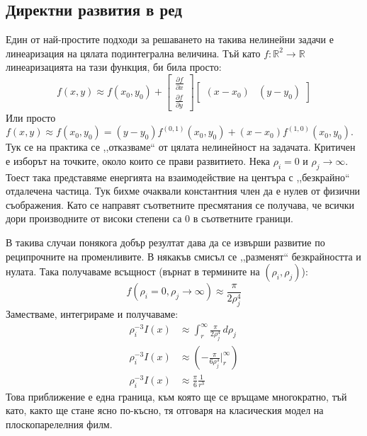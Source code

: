 \subsection{Директни развития в ред}
Един от най-простите подходи за решаването на такива нелинейни задачи е линеаризация на цялата подинтегрална величина. Тъй като $f: \mathbb{R}^2 \rightarrow \mathbb{R}$ линеаризацията на тази функция, би била просто:
\begin{equation*}
	f(x,y) \approx f(x_0,y_0) + \begin{bmatrix}
	\frac{\partial f}{\partial x} \\
	\frac{\partial f}{\partial y} 
	\end{bmatrix} 
	\begin{bmatrix}
		(x-x_0) & (y-y_0) 
	\end{bmatrix}
\end{equation*}
Или просто $f(x,y) \approx f(x_0, y_0) = (y-y_0) f^{(0,1)}(x_0,y_0)+ (x-x_0) f^{(1,0)}(x_0,y_0)$.
Тук се на практика се ,,отказваме`` от цялата нелинейност на задачата. Критичен е изборът на точките, около които се прави развитието.
Нека $\rho_i = 0$ и $\rho_j \rightarrow \infty$. Тоест така представяме енергията на взаимодействие на центъра с ,,безкрайно`` отдалечена частица.
Тук бихме очаквали константния член да е нулев от физични съображения. Като се направят съответните пресмятания се получава, че всички дори производните от високи степени са 0 в съответните граници.

В такива случаи понякога добър резултат дава да се извърши развитие по реципрочните на променливите. В някакъв смисъл се ,,разменят`` безкрайността и нулата.
Така получаваме всъщност (върнат в термините на $(\rho_i, \rho_j)$):
\begin{equation*}
	f(\rho_i = 0, \rho_j \rightarrow \infty) \approx \frac{\pi}{2 \rho_{j}^4}
\end{equation*}
Заместваме, интегрираме и получаваме:
\begin{align*}
	\rho_{i}^{-3} I(x) & \approx \displaystyle\int_{r}^{\infty} \frac{\pi}{2 \rho_{j}^4}  \,d\rho_j \\
	\rho_{i}^{-3} I(x) & \approx  \left( -\frac{\pi }{6 \rho_j^3}\big|_{r}^{\infty}  \right)        \\
	\rho_{i}^{-3} I(x) & \approx \frac{\pi}{6} \frac{1}{r^3}                                        
\end{align*}
Това приближение е една граница, към която ще се връщаме многократно, тъй като, както ще стане ясно по-късно, тя отговаря на класическия модел на плоскопарелелния филм.

